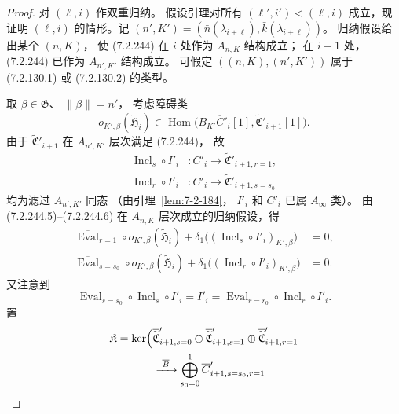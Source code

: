 \begin{proof}
对 $(\ell,i)$ 作双重归纳。
假设引理对所有
$(\ell',i')<(\ell,i)$ 成立，现证明
$(\ell,i)$ 的情形。记
$(n',K')=(\bar n(\lambda_{i+\ell}),
\bar k(\lambda_{i+\ell}))$。
归纳假设给出某个 $(n,K)$，
使 (7.2.244) 在 $i$ 处作为
$A_{n,K}$ 结构成立；
在 $i+1$ 处，(7.2.244) 已作为
$A_{n',K'}$ 结构成立。
可假定 $((n,K),(n',K'))$ 属于
(7.2.130.1) 或 (7.2.130.2) 的类型。

取 $\beta\in\mathfrak G$、
$\lVert\beta\rVert=n'$，
考虑障碍类
\[
o_{K',\beta}(\widetilde{\mathfrak H}_i)
\in\operatorname{Hom}\bigl(
B_{K'}\overline C'_i[1],
\overline{\widetilde{\mathfrak C}}'_{i+1}[1]
\bigr).
\]
由于
$\widetilde{\mathfrak C}'_{i+1}$
在 $A_{n',K'}$ 层次满足 (7.2.244)，
故
\[
\begin{aligned}
\operatorname{Incl}_s\circ I'_i
&\colon C'_i\to
\widetilde{\mathfrak C}'_{i+1,r=1},\\
\operatorname{Incl}_r\circ I'_i
&\colon C'_i\to
\widetilde{\mathfrak C}'_{i+1,s=s_0}
\end{aligned}
\]
均为滤过 $A_{n',K'}$ 同态
（由引理~\ref{lem:7-2-184}，
$I'_i$ 和 $C'_i$ 已属 $A_\infty$ 类）。
由 (7.2.244.5)--(7.2.244.6)
在 $A_{n,K}$ 层次成立的归纳假设，得
\begin{equation}
\begin{aligned}
\overline{\operatorname{Eval}}_{r=1}\circ
o_{K',\beta}(\widetilde{\mathfrak H}_i)
+\delta_1\bigl(
(\operatorname{Incl}_s\circ I'_i)_{K',\beta}
\bigr)&=0,\\
\overline{\operatorname{Eval}}_{s=s_0}\circ
o_{K',\beta}(\widetilde{\mathfrak H}_i)
+\delta_1\bigl(
(\operatorname{Incl}_r\circ I'_i)_{K',\beta}
\bigr)&=0.
\end{aligned}
\tag{7.2.245}\label{eq:7-2-245}
\end{equation}
又注意到
\begin{equation}
\operatorname{Eval}_{s=s_0}\circ
\operatorname{Incl}_s\circ I'_i
=I'_i
=\operatorname{Eval}_{r=r_0}\circ
\operatorname{Incl}_r\circ I'_i.
\tag{7.2.246}\label{eq:7-2-246}
\end{equation}
置
\begin{equation}
\begin{aligned}
\mathfrak K
=\ker\Bigl(
&\overline{\widetilde{\mathfrak C}}'_{i+1,s=0}
\oplus
\overline{\widetilde{\mathfrak C}}'_{i+1,s=1}
\oplus
\overline{\widetilde{\mathfrak C}}'_{i+1,r=1}\\
&\xrightarrow{\ \overline B\ }
\bigoplus_{s_0=0}^{1}
\overline C'_{i+1,s=s_0,r=1}

\end{aligned}
\end{equation}
\end{proof}
